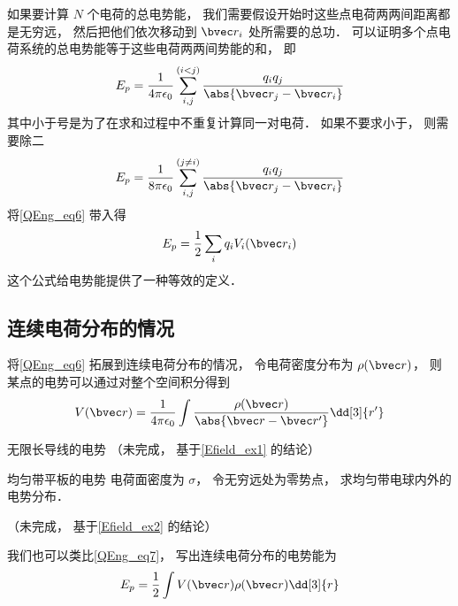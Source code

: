 如果要计算 $N$ 个电荷的总电势能， 我们需要假设开始时这些点电荷两两间距离都是无穷远， 然后把他们依次移动到 $\bvec r_i$ 处所需要的总功． 可以证明多个点电荷系统的总电势能等于这些电荷两两间势能的和， 即
\begin{equation}
E_p = \frac{1}{4\pi\epsilon_0} \sum_{i,j}^{(i < j)} \frac{q_i q_j}{\abs{\bvec r_j - \bvec r_i}}
\end{equation}
其中小于号是为了在求和过程中不重复计算同一对电荷． 如果不要求小于， 则需要除二
\begin{equation}
E_p = \frac{1}{8\pi\epsilon_0} \sum_{i, j}^{(j\neq i)} \frac{q_i q_j}{\abs{\bvec r_j - \bvec r_i}}
\end{equation}
将\autoref{QEng_eq6} 带入得
\begin{equation}\label{QEng_eq7}
E_p = \frac12 \sum_i q_i V_i(\bvec r_i)
\end{equation}
这个公式给电势能提供了一种等效的定义．

\subsection{连续电荷分布的情况}
将\autoref{QEng_eq6} 拓展到连续电荷分布的情况， 令电荷密度分布为 $\rho(\bvec r)$， 则某点的电势可以通过对整个空间积分得到
\begin{equation}
V(\bvec r) = \frac{1}{4\pi\epsilon_0} \int \frac{\rho(\bvec r)}{\abs{\bvec r - \bvec r'}} \dd[3]{r'}
\end{equation}

\begin{example}{无限长导线的电势}
（未完成， 基于\autoref{Efield_ex1} 的结论）
\end{example}

\begin{example}{均匀带平板的电势}
电荷面密度为 $\sigma$， 令无穷远处为零势点， 求均匀带电球内外的电势分布．

（未完成， 基于\autoref{Efield_ex2} 的结论）
\end{example}

我们也可以类比\autoref{QEng_eq7}， 写出连续电荷分布的电势能为
\begin{equation}\label{QEng_eq8}
E_p = \frac 12 \int V(\bvec r) \rho(\bvec r) \dd[3]{r}
\end{equation}

